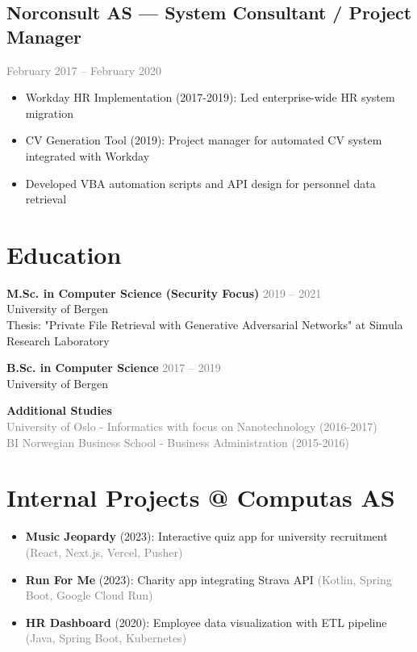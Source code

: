 \documentclass[11pt,a4paper]{article}
\begin{document}
\subsection{Norconsult AS — System Consultant / Project Manager}
\textcolor{gray}{February 2017 – February 2020}
\begin{itemize}[itemsep=0.3em, leftmargin=*]
\item Workday HR Implementation (2017-2019): Led enterprise-wide HR system migration
\item CV Generation Tool (2019): Project manager for automated CV system integrated with Workday
\item Developed VBA automation scripts and API design for personnel data retrieval
\end{itemize}

\vspace{10pt}

\section{Education}

\textbf{M.Sc. in Computer Science (Security Focus)} \hfill \textcolor{gray}{2019 – 2021}\\
University of Bergen\\
Thesis: "Private File Retrieval with Generative Adversarial Networks" at Simula Research Laboratory

\vspace{10pt}

\textbf{B.Sc. in Computer Science} \hfill \textcolor{gray}{2017 – 2019}\\
University of Bergen

\vspace{10pt}

\textbf{Additional Studies}\\
\textcolor{gray}{University of Oslo - Informatics with focus on Nanotechnology (2016-2017)}\\
\textcolor{gray}{BI Norwegian Business School - Business Administration (2015-2016)}

\vspace{10pt}

\section{Internal Projects @ Computas AS}

\begin{itemize}[itemsep=0.5em, leftmargin=*]
\item \textbf{Music Jeopardy} (2023): Interactive quiz app for university recruitment \textcolor{gray}{(React, Next.js, Vercel, Pusher)}
\item \textbf{Run For Me} (2023): Charity app integrating Strava API \textcolor{gray}{(Kotlin, Spring Boot, Google Cloud Run)}
\item \textbf{HR Dashboard} (2020): Employee data visualization with ETL pipeline \textcolor{gray}{(Java, Spring Boot, Kubernetes)}
\end{itemize}
\end{document}
